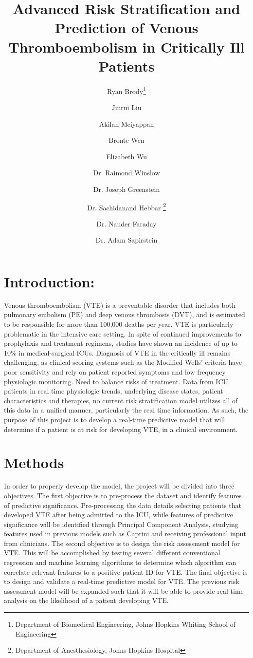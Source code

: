 \documentclass{article}[10pt,letterpaper]
\title{Advanced Risk Stratification and Prediction of Venous Thromboembolism in Critically Ill Patients}
\author{
Ryan Brody\thanks{Department of Biomedical Engineering, Johns Hopkins Whiting School of Engineering}
\and Jinrui Liu\footnotemark[1]
\and Akilan Meiyappan\footnotemark[1] 
\and Bronte Wen\footnotemark[1]
\and Elizabeth Wu\footnotemark[1]
\and Dr. Raimond Winslow\footnotemark[1] 
\and Dr. Joseph Greenstein\footnotemark[1]
\and Dr. Sachidanand Hebbar \thanks{Department of Anesthesiology, Johns Hopkins Hospital}
\and Dr. Nauder Faraday\footnotemark[2]
\and Dr. Adam Sapirstein\footnotemark[2]
}
\begin{document}
\maketitle

\section{Introduction:}
Venous thromboembolism (VTE) is a preventable disorder that includes both pulmonary embolism (PE) and deep venous thrombosis (DVT), and is estimated to be responsible for more than 100,000 deaths per year\cite{SG}. VTE is particularly problematic in the intensive care setting. In spite of continued improvements to prophylaxis and treatment regimens, studies have shown an incidence of up to 10\% in medical-surgical ICUs. Diagnosis of VTE in the critically ill remains challenging, as clinical scoring systems such as the Modified Wells’ criteria have poor sensitivity and rely on patient reported symptoms and low frequency physiologic monitoring. Need to balance risks of treatment. Data from ICU patients in real time physiologic trends, underlying disease states, patient characteristics and therapies, no current risk stratification model utilizes all of this data in a unified manner, particularly the real time information. As such, the purpose of this project is to develop a real-time predictive model that will determine if a patient is at risk for developing VTE, in a clinical environment.
\section{Methods}
In order to properly develop the model, the project will be divided into three objectives. The first objective is to pre-process the dataset and identify features of predictive significance. Pre-processing the data details selecting patients that developed VTE after being admitted to the ICU, while features of predictive significance will be identified through Principal Component Analysis, studying features used in previous models such as Caprini and receiving professional input from clinicians. The second objective is to design the risk assessment model for VTE. This will be accomplished by testing several different conventional regression and machine learning algorithms to determine which algorithm can correlate relevant features to a positive patient ID for VTE. The final objective is to design and validate a real-time predictive model for VTE. The previous risk assessment model will be expanded such that it will be able to provide real time analysis on the likelihood of a patient developing VTE. 
\end{document}
